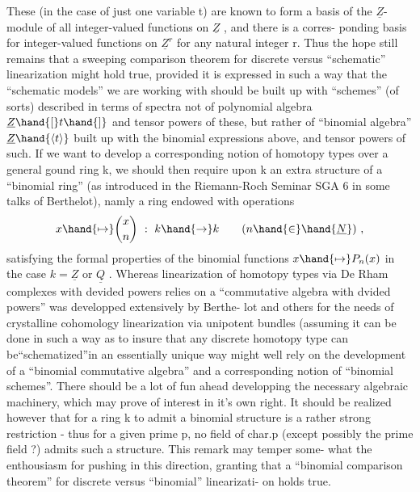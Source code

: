 These (in the case of just one variable t) are known to form a basis of
the $\underline{Z}$-module of all integer-valued functions on $\underline{Z}$ ,  and there is a corres-%
ponding basis for integer-valued functions on $\underline{Z}^r$\hand{,} for any natural integer
r.  Thus the hope still remains that a sweeping comparison theorem for
discrete versus ``schematic''  linearization might hold true,
provided it is expressed in such a way that the ``schematic models'' we are
working with should be built up with ``schemes'' (of sorts) described in
terms of spectra not of polynomial algebra  $\underline{Z}\hand{[}t\hand{]}$ and tensor powers of
these,  but rather of  ``binomial algebra''  $\underline{Z}\hand{\langle t\rangle}$ built up with the binomial
expressions above,  and tensor powers  of such.  If we want to develop a
corresponding notion of homotopy types over a general gound ring k,  we
should then require upon k an extra structure of a ``binomial ring'' (as
introduced in the Riemann-Roch Seminar SGA 6 in some talks of Berthelot),
namly a ring endowed with operations
\[ x \hand{\mapsto} \binom{x}{n} \ : \ k \hand{\to} k \qquad (n \hand{\in} \hand{\underline{N}}) \ , \]
satisfying the formal properties of the binomial functions  $x \hand{\mapsto} P_n(x)$
in the case $k=\underline{Z}$ or $\underline{Q}$ .  Whereas linearization of homotopy types via De
Rham complexes with devided powers relies on a ``commutative algebra with
dvided powers''   was developped extensively by Berthe-%
lot and others for the needs of crystalline cohomology\hand{)}\hand{,}  linearization via
unipotent bundles (assuming it can be done in such a way as to insure that
any discrete homotopy type can be``schematized''in an essentially unique way\hand{)}
might well rely on the development of a ``binomial commutative algebra''
and a corresponding notion of ``binomial schemes''.  There should be a lot
of fun ahead developping the necessary algebraic machinery,  which may
prove of interest in it's own right.  It should be realized however that 
for a ring k to admit a binomial structure is a rather strong restriction
  -  thus for a given prime p,  no field of char.p (except possibly
the prime field ?) admits such a structure.  This remark may temper some-%
what the enthousiasm for pushing in this direction,  granting that a
``binomial comparison theorem'' for discrete versus ``binomial'' linearizati-%
on holds true.


